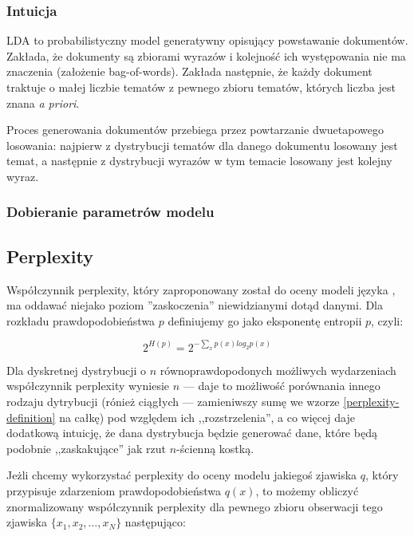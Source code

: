 \documentclass[11pt,a4paper]{article}
\begin{document}
\subsubsection{Intuicja}

LDA to probabilistyczny model generatywny opisujący powstawanie dokumentów.
Zakłada, że dokumenty są zbiorami wyrazów i kolejność ich występowania nie ma
znaczenia (założenie bag-of-words). Zakłada następnie, że każdy dokument
traktuje o małej liczbie tematów z pewnego zbioru tematów, których liczba jest
znana \emph{a priori}.

Proces generowania dokumentów przebiega przez powtarzanie dwuetapowego
losowania: najpierw z dystrybucji tematów dla danego dokumentu losowany jest
temat, a następnie z dystrybucji wyrazów w tym temacie losowany jest kolejny
wyraz.

\subsubsection{Dobieranie parametrów modelu}

\subsection{Perplexity}

Współczynnik perplexity, który zaproponowany został do oceny modeli języka
\cite{bahl-perplexity}, ma oddawać niejako poziom ''zaskoczenia'' niewidzianymi
dotąd danymi. Dla rozkładu prawdopodobieństwa $p$ definiujemy go jako
eksponentę entropii $p$, czyli:

\begin{equation}
  \label{perplexity-definition}
  2^{H(p)} = 2^{-\sum_x p(x)log_2 p(x)}
\end{equation}

Dla dyskretnej dystrybucji o $n$ równoprawdopodonych możliwych wydarzeniach
współczynnik perplexity wyniesie $n$ --- daje to możliwość porównania innego
rodzaju dytrybucji (rónież ciągłych --- zamieniwszy sumę we wzorze
\ref{perplexity-definition} na całkę) pod względem ich ,,rozstrzelenia'', a co
więcej daje dodatkową intuicję, że dana dystrybucja będzie generować dane,
które będą podobnie ,,zaskakujące'' jak rzut $n$-ścienną kostką.

Jeżli chcemy wykorzystać perplexity do oceny modelu jakiegoś zjawiska $q$,
który przypisuje zdarzeniom prawdopodobieństwa $q(x)$, to możemy obliczyć
znormalizowany współczynnik perplexity dla pewnego zbioru obserwacji tego zjawiska
$\{x_1, x_2, \ldots, x_N\}$ następująco:
\end{document}
